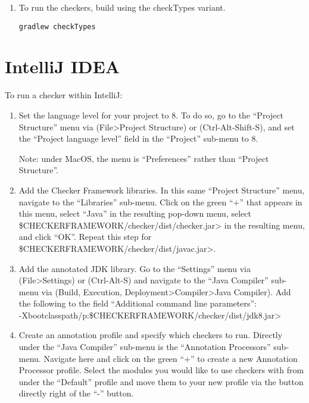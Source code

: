 \begin{enumerate}
\item To run the checkers, build using the checkTypes variant.
\begin{Verbatim}
gradlew checkTypes
\end{Verbatim}

\end{enumerate}

\section{IntelliJ IDEA\label{intellij}}


To run a checker within IntelliJ:

\begin{enumerate}

\item
  Set the language level for your project to 8.  To do so, go to the
  ``Project Structure'' menu via (File>Project Structure) or
  (Ctrl-Alt-Shift-S), and set the ``Project language level'' field in the
  ``Project'' sub-menu to 8.

  Note: under MacOS, the menu is ``Preferences'' rather than ``Project Structure''.

\item
  Add the Checker Framework libraries.  In this same ``Project Structure''
  menu, navigate to the ``Libraries'' sub-menu.  Click on the green ``+'' that
  appears in this menu, select ``Java'' in the resulting pop-down menu,
  select \<\$CHECKERFRAMEWORK/checker/dist/checker.jar> in the resulting menu,
  and click ``OK''. Repeat this step for
  \<\$CHECKERFRAMEWORK/checker/dist/javac.jar>.

\item
  Add the annotated JDK library.
  Go to the ``Settings'' menu via (File>Settings) or (Ctrl-Alt-S) and
  navigate to the ``Java Compiler'' sub-menu via (Build, Execution,
  Deployment>Compiler>Java Compiler).  Add the following to the field
  ``Additional command line parameters'': \\
  \<-Xbootclasspath/p:\$CHECKERFRAMEWORK/checker/dist/jdk8.jar>

\item
  Create an annotation profile and specify which checkers to run.
  Directly under the ``Java Compiler'' sub-menu is the ``Annotation
  Processors'' sub-menu. Navigate here and click on the green ``+'' to create
  a new Annotation Processor profile. Select the modules you would like to
  use checkers with from under the ``Default'' profile and move them to your
  new profile via the button directly right of the ``-'' button.


\end{enumerate}
